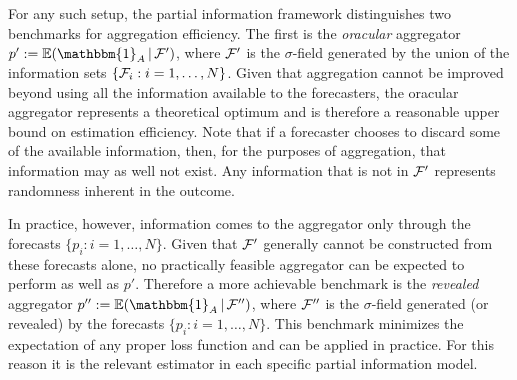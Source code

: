 \documentclass[12pt]{article}
\newcommand{\E}{\mathbb{E}}
\theoremstyle{definition}
\theoremstyle{definition}
\def\one{\mathbbm{1}}
\def\F{{\cal F}}
\def\E{{\mathbb E}}
\def\|{\, | \,}
\begin{document}
For any such setup, the partial information framework distinguishes two benchmarks for aggregation efficiency.  The first is the {\em oracular} aggregator
$p' := \E (\one_A \| \F')$, where $\F'$ is the $\sigma$-field
generated by the union of the information sets $\{ \F_i : i = 1, \dots,
N\}$. Given that aggregation cannot be improved beyond using all the information available
to the forecasters, the oracular aggregator represents a theoretical optimum and is therefore a
reasonable upper bound on estimation efficiency. Note that if a forecaster chooses to discard
some of the available information, then, for the purposes of aggregation,
that information may as well not exist. Any
information that is not in $\F'$ represents randomness inherent in the
outcome.

In practice, however, information comes to the
aggregator only through the forecasts $\{p_i : i = 1, \dots, N\}$. Given that $\F'$ generally cannot be constructed from these forecasts alone, no practically feasible aggregator can be expected to perform as well as $p'$.  Therefore a more achievable benchmark is the \textit{revealed} aggregator $p'' := \E (\one_A \|
\F'')$, where $\F''$ is the $\sigma$-field generated (or revealed) by the forecasts
$\{ p_i : i = 1, \dots, N \}$. This benchmark minimizes
the expectation of any proper loss function \citep{Ranjan08} and can be applied in practice. For this reason it is the relevant estimator in each specific partial information model. 




\end{document}

